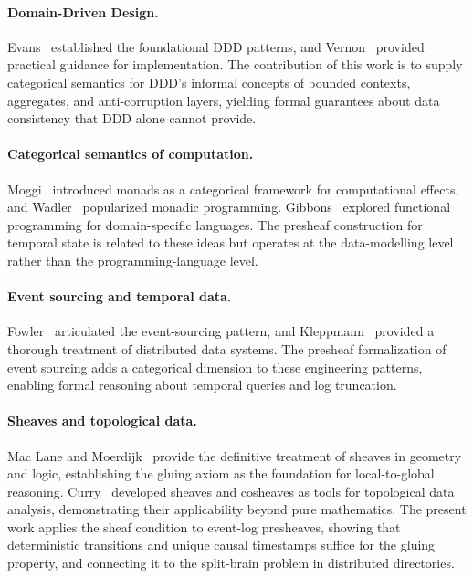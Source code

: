\documentclass[11pt,a4paper]{article}
\begin{document}
\paragraph{Domain-Driven Design.}
Evans~\citep{evans2004} established the foundational DDD patterns, and
Vernon~\citep{vernon2013} provided practical guidance for implementation.
The contribution of this work is to supply categorical semantics for DDD's informal
concepts of bounded contexts, aggregates, and anti-corruption layers,
yielding formal guarantees about data consistency that DDD alone
cannot provide.

\paragraph{Categorical semantics of computation.}
Moggi~\citep{moggi1991} introduced monads as a categorical framework for
computational effects, and Wadler~\citep{wadler1995} popularized monadic
programming. Gibbons~\citep{gibbons2013} explored functional programming
for domain-specific languages. The presheaf construction for temporal
state is related to these ideas but operates at the data-modelling level
rather than the programming-language level.

\paragraph{Event sourcing and temporal data.}
Fowler~\citep{fowler2005} articulated the event-sourcing pattern, and
Kleppmann~\citep{kleppmann2017} provided a thorough treatment of
distributed data systems. The presheaf formalization of event sourcing
adds a categorical dimension to these engineering patterns, enabling
formal reasoning about temporal queries and log truncation.

\paragraph{Sheaves and topological data.}
Mac Lane and Moerdijk~\citep{maclane1992} provide the definitive treatment
of sheaves in geometry and logic, establishing the gluing axiom as the
foundation for local-to-global reasoning. Curry~\citep{curry2014}
developed sheaves and cosheaves as tools for topological data analysis,
demonstrating their applicability beyond pure mathematics. The present
work applies the sheaf condition to event-log presheaves, showing that
deterministic transitions and unique causal timestamps suffice for the
gluing property, and connecting it to the split-brain problem in
distributed directories.
\end{document}
